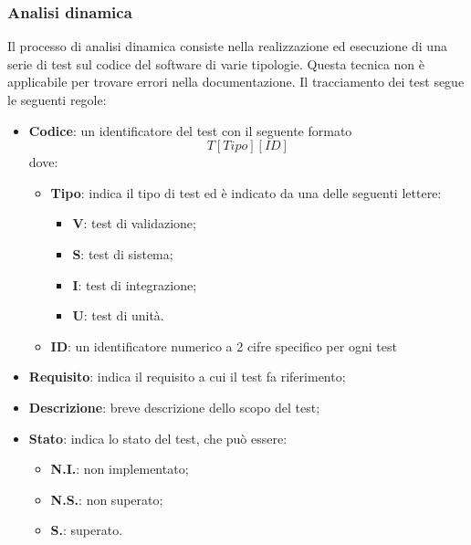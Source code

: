 		\subsubsection{Analisi dinamica}
			Il processo di analisi dinamica consiste nella realizzazione ed esecuzione di una serie di test sul codice del software di varie tipologie.  Questa tecnica non è applicabile per trovare errori nella documentazione.\newline
			Il tracciamento dei test segue le seguenti regole:
\begin{itemize}
    \item \textbf{Codice}: un identificatore del test con il seguente formato
    \[
        T[Tipo][ID]
    \]
    dove:
    \begin{itemize}
        \item \textbf{Tipo}: indica il tipo di test ed è indicato da una delle seguenti lettere:
        \begin{itemize}
            \item \textbf{V}: test di validazione;
            \item \textbf{S}: test di sistema;
            \item \textbf{I}: test di integrazione;
            \item \textbf{U}: test di unità.
        \end{itemize}
        \item \textbf{ID}: un identificatore numerico a 2 cifre specifico per ogni test
    \end{itemize}
    \item \textbf{Requisito}: indica il requisito a cui il test fa riferimento; 
    \item \textbf{Descrizione}: breve descrizione dello scopo del test;
    \item \textbf{Stato}: indica lo stato del test, che può essere:
    \begin{itemize}
        \item \textbf{N.I.}: non implementato;
        \item \textbf{N.S.}: non superato;
        \item \textbf{S.}: superato.
    \end{itemize}
\end{itemize}
